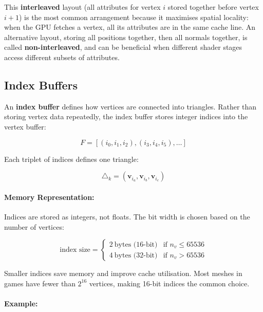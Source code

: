 \documentclass[11pt]{article}
\begin{document}
This \textbf{interleaved} layout (all attributes for vertex $i$ stored together before vertex $i+1$) is the most common arrangement because it maximises spatial locality: when the GPU fetches a vertex, all its attributes are in the same cache line. An alternative layout, storing all positions together, then all normals together, is called \textbf{non-interleaved}, and can be beneficial when different shader stages access different subsets of attributes.


\subsection{Index Buffers}

An \textbf{index buffer} defines how vertices are connected into triangles. Rather than storing vertex data repeatedly, the index buffer stores integer indices into the vertex buffer:

\begin{equation}
    F = [(i_0, i_1, i_2), (i_3, i_4, i_5), \dots]
\end{equation}

Each triplet of indices defines one triangle:

\begin{equation}
    \triangle_k =
    (\mathbf{v}_{i_a}, \mathbf{v}_{i_b}, \mathbf{v}_{i_c})
\end{equation}

\paragraph{Memory Representation:}

Indices are stored as integers, not floats. The bit width is chosen based on the number of vertices:

\begin{equation}
    \text{index size} =
    \begin{cases}
        2\ \text{bytes (16-bit)} & \text{if } n_v \leq 65536 \\
        4\ \text{bytes (32-bit)} & \text{if } n_v > 65536
    \end{cases}
\end{equation}

Smaller indices save memory and improve cache utilisation. Most meshes in games have fewer than $2^{16}$ vertices, making 16-bit indices the common choice.

\paragraph{Example:}
\end{document}
